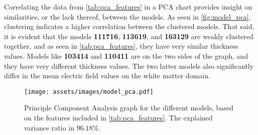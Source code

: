 Correlating the data from \autoref{tab:pca_features} in a \gls{PCA} chart provides insight on similarities, or the lack thereof, between the models. As seen in \autoref{fig:model_pca}, clustering indicates a higher correlation between the clustered models. That said, it is evident that the models \textbf{111716}, \textbf{113619}, and \textbf{163129} are weakly clustered together, and as seen in \autoref{tab:pca_features}, they have very similar thickness values. Models like \textbf{103414} and \textbf{110411} are on the two sides of the graph, and they have very different thickness values. The two latter models also significantly differ in the mean electric field values on the white matter domain.
\begin{figure}[H]
    \centering
    \texttt{[image: assets/images/model\_pca.pdf]}
    \caption{Principle Component Analysis graph for the different models, based on the features included in \autoref{tab:pca_features}. The explained variance ratio in $\boldsymbol{96.18\%}$.}
    \label{fig:model_pca}
\end{figure}


